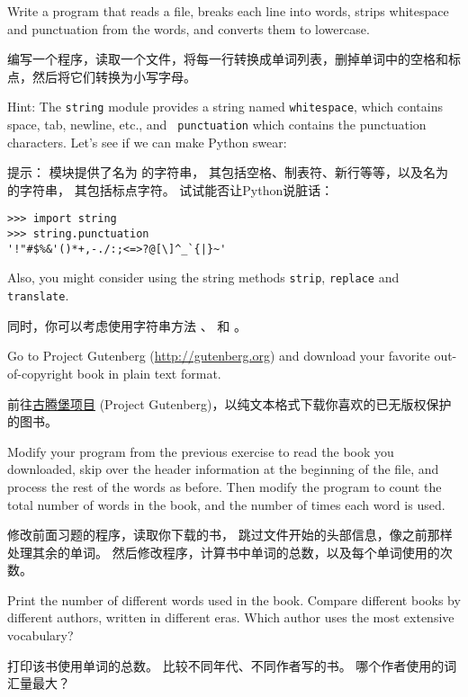 \begin{exercise}

Write a program that reads a file, breaks each line into
words, strips whitespace and punctuation from the words, and
converts them to lowercase.

编写一个程序，读取一个文件，将每一行转换成单词列表，删掉单词中的空格和标点，然后将它们转换为小写字母。


Hint: The {\tt string} module provides a string named {\tt whitespace},
which contains space, tab, newline, etc., and {\tt
  punctuation} which contains the punctuation characters.  Let's see
if we can make Python swear:

提示：  模块提供了名为  的字符串，
其包括空格、制表符、新行等等，以及名为  的字符串，
其包括标点字符。 试试能否让Python说脏话：

\begin{lstlisting}
>>> import string
>>> string.punctuation
'!"#$%&'()*+,-./:;<=>?@[\]^_`{|}~'
\end{lstlisting}
%
Also, you might consider using the string methods {\tt strip},
{\tt replace} and {\tt translate}.

同时，你可以考虑使用字符串方法  、  和 。

\end{exercise}

\begin{exercise}
Go to Project Gutenberg (\url{http://gutenberg.org}) and download
your favorite out-of-copyright book in plain text format.

前往\href{http://gutenberg.org}{古腾堡项目} (Project Gutenberg)，以纯文本格式下载你喜欢的已无版权保护的图书。

Modify your program from the previous exercise to read the book
you downloaded, skip over the header information at the beginning
of the file, and process the rest of the words as before.
Then modify the program to count the total number of words in
the book, and the number of times each word is used.

修改前面习题的程序，读取你下载的书，
跳过文件开始的头部信息，像之前那样处理其余的单词。
然后修改程序，计算书中单词的总数，以及每个单词使用的次数。

Print the number of different words used in the book.  Compare
different books by different authors, written in different eras.
Which author uses the most extensive vocabulary?

打印该书使用单词的总数。 比较不同年代、不同作者写的书。
哪个作者使用的词汇量最大？

\end{exercise}

